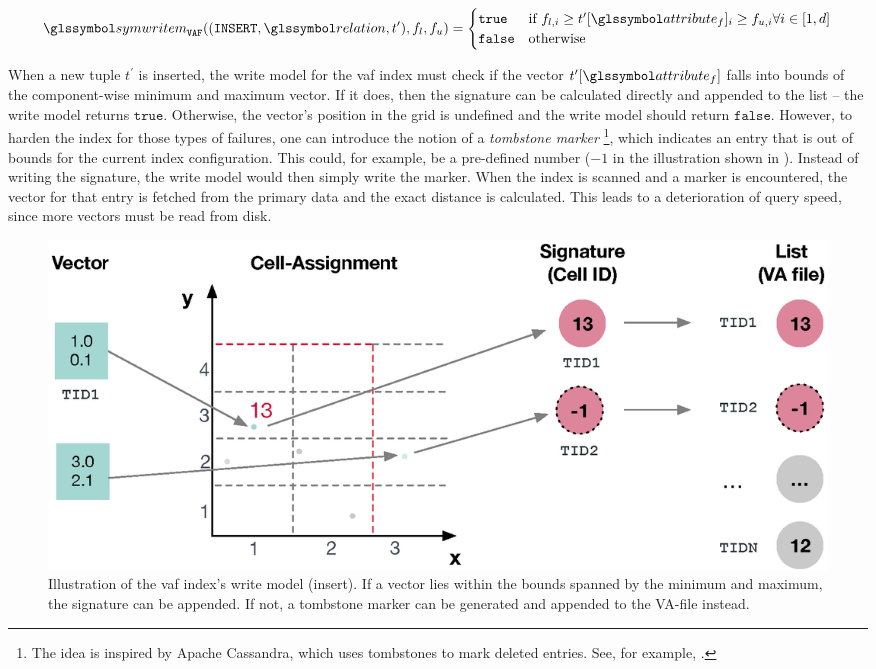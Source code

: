 \begin{equation}
    \label{equation:write_model_insert_vaf}
    \symwritem_{\mathtt{VAF}}((\mathtt{INSERT}, \relation, t^{\prime}),f_{l},f_{u}) =
    \begin{cases}
        \mathtt{true} & \text{if } f_{l,i} \geq t^{\prime}[\attribute_f]_i \geq f_{u,i} \forall i \in [1,d]\\
        \mathtt{false} & \text{otherwise}
    \end{cases}
\end{equation}

When a new tuple $t^{\prime}$ is inserted, the write model for the \acrshort{vaf} index must check if the vector $t^{\prime}[\attribute_f]$ falls into bounds of the component-wise minimum and maximum vector. If it does, then the signature can be calculated directly and appended to the list -- the write model returns $\mathtt{true}$. Otherwise, the vector's position in the grid is undefined and the write model should return $\mathtt{false}$. However, to harden the index for those types of failures, one can introduce the notion of a \emph{tombstone marker} \footnote{The idea is inspired by Apache Cassandra, which uses tombstones to mark deleted entries. See, for example, \cite{Padalia:2015Apache}.}, which indicates an entry that is out of bounds for the current index configuration. This could, for example, be a pre-defined number ($-1$ in the illustration shown in ). Instead of writing the signature, the write model would then simply write the marker. When the index is scanned and a marker is encountered, the vector for that entry is fetched from the primary data and the exact distance is calculated. This leads to a deterioration of query speed, since more vectors must be read from disk.

\begin{figure}
    \centering
    \includegraphics[width=\textwidth]{figures/vaf-write-model}
    \caption{Illustration of the \acrshort{vaf} index's write model (insert). If a vector lies within the bounds spanned by the minimum and maximum, the signature can be appended. If not, a tombstone marker can be generated and appended to the VA-file instead.}
    \label{figure:write_model_insert_vaf}
\end{figure}

